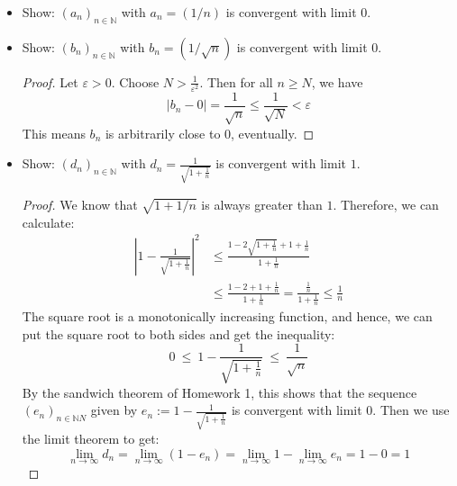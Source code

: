 \begin{example}
\begin{itemize}
	\item Show: $(a_{n})_{n \in \mathbb{N}}$ with $a_n = (1/n)$ is convergent with limit $0$.
	\item Show: $(b_{n})_{n \in \mathbb{N}}$ with $b_n = (1/\sqrt{n})$ is convergent with limit $0$.
		\begin{proof}
			Let $\varepsilon > 0$. Choose $N > \frac{1}{\varepsilon^2}$. Then for all $n \geq N$, we have
				$$
					|b_n - 0| = \frac{1}{\sqrt{n}} \leq \frac{1}{\sqrt{N}} < \varepsilon 
				$$
			This means $b_n$ is arbitrarily close to $0$, eventually.
		\end{proof}
	\item Show: $(d_{n})_{n \in \mathbb{N}}$ with $\displaystyle d_n = \frac{1}{\sqrt{1 + \frac{1}{n}}}$ is convergent with limit $1$.
			\begin{proof}
			We know that $\sqrt{1 + 1/n}$ is always greater than $1$. Therefore, we can calculate:
				\begin{align*}
				|1 - \frac{1}{\sqrt{1 + \frac{1}{n}}} |^2  &\leq 
				\frac{ 1- 2 \sqrt{1 + \frac{1}{n}} + 1 + \frac{1}{n}}{1 + \frac{1}{n}} \\
				&\leq		\frac{ 1- 2 + 1 + \frac{1}{n}}{1 + \frac{1}{n}}		= 	
				\frac{ \frac{1}{n}}{1 + \frac{1}{n}} \leq \frac{1}{n}
				\end{align*}
			The square root is a monotonically increasing function, and hence, we can put the square root to both
			sides and get the inequality:
				$$
					0 ~\leq~ 1 - \frac{1}{\sqrt{1 + \frac{1}{n}}} ~\leq~ \frac{1}{\sqrt{n}}
				$$
			By the sandwich theorem of Homework 1, this shows that the sequence $(e_n)_{n \in \mathbb{N}N}$ given by
			$e_n := 1 - \frac{1}{\sqrt{1 + \frac{1}{n}}}$ is convergent with limit $0$. Then we use
			the limit theorem to get:
				$$
					\lim_{n \rightarrow \infty} d_n = \lim_{n \rightarrow \infty} (1 - e_n) = 
					\lim_{n \rightarrow \infty} 1 - \lim_{n \rightarrow \infty} e_n = 1 - 0 = 1
				$$
		\end{proof}
\end{itemize}
\end{example}


